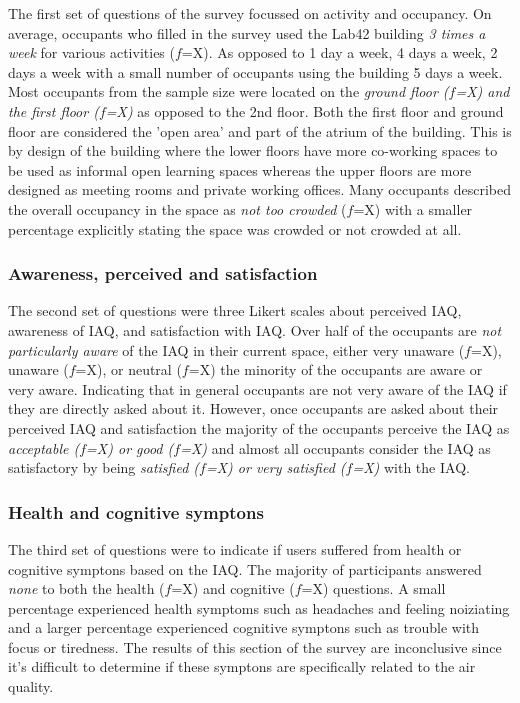 The first set of questions of the survey focussed on activity and occupancy. On average, occupants who filled in the survey used the Lab42 building \textit{3 times a week} for various activities ($f$=X). As opposed to 1 day a week, 4 days a week, 2 days a week with a small number of occupants using the building 5 days a week. Most occupants from the sample size were located on the \textit{ground floor ($f$=X) and the first floor ($f$=X)} as opposed to the 2nd floor. Both the first floor and ground floor are considered the 'open area' and part of the atrium of the building. This is by design of the building where the lower floors have more co-working spaces to be used as informal open learning spaces whereas the upper floors are more designed as meeting rooms and private working offices. Many occupants described the overall occupancy in the space as \textit{not too crowded} ($f$=X) with a smaller percentage explicitly stating the space was crowded or not crowded at all.

\subsubsection{Awareness, perceived and satisfaction}

The second set of questions were three Likert scales about perceived IAQ, awareness of IAQ, and satisfaction with IAQ. Over half of the occupants are \textit{not particularly aware} of the IAQ in their current space, either very unaware ($f$=X), unaware ($f$=X), or neutral ($f$=X) the minority of the occupants are aware or very aware. Indicating that in general occupants are not very aware of the IAQ if they are directly asked about it. However, once occupants are asked about their perceived IAQ and satisfaction the majority of the occupants perceive the IAQ as \textit{acceptable ($f$=X) or good ($f$=X)} and almost all occupants consider the IAQ as satisfactory by being \textit{satisfied ($f$=X) or very satisfied ($f$=X)} with the IAQ.

\subsubsection{Health and cognitive symptons}

The third set of questions were to indicate if users suffered from health or cognitive symptons based on the IAQ. The majority of participants answered \textit{none} to both the health ($f$=X) and cognitive ($f$=X) questions. A small percentage experienced health symptoms such as headaches and feeling noiziating and a larger percentage experienced cognitive symptons such as trouble with focus or tiredness. The results of this section of the survey are inconclusive since it's difficult to determine if these symptons are specifically related to the air quality.


